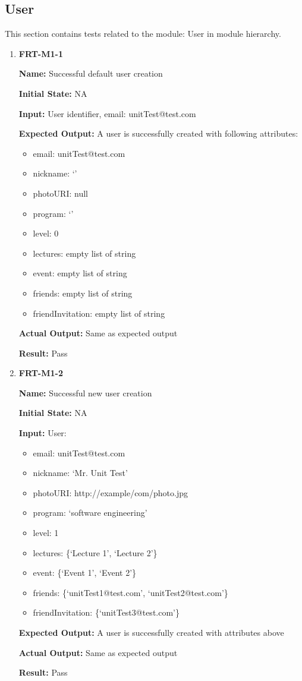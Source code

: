 \documentclass[12pt, titlepage]{article}
\begin{document}
\subsection{User}
This section contains tests related to the module: User in module hierarchy.
\begin{enumerate}
\item \textbf{FRT-M1-1}

\textbf{Name:} Successful default user creation

\textbf{Initial State:} NA

\textbf{Input:} User identifier, email: unitTest@test.com
					
\textbf{Expected Output:} A user is successfully created with following attributes:
\begin{itemize}
\item email: unitTest@test.com
\item nickname: `'
\item photoURI: null
\item program: `'
\item level: 0
\item lectures: empty list of string
\item event: empty list of string
\item friends: empty list of string
\item friendInvitation: empty list of string
\end{itemize}

\textbf{Actual Output:} Same as expected output

\textbf{Result:} Pass

\item \textbf{FRT-M1-2}

\textbf{Name:} Successful new user creation

\textbf{Initial State:} NA

\textbf{Input:} User:
\begin{itemize}
\item email: unitTest@test.com
\item nickname: `Mr. Unit Test'
\item photoURI: http://example/com/photo.jpg
\item program: `software engineering'
\item level: 1
\item lectures: \{`Lecture 1', `Lecture 2'\}
\item event: \{`Event 1', `Event 2'\}
\item friends: \{`unitTest1@test.com', `unitTest2@test.com'\}
\item friendInvitation: \{`unitTest3@test.com'\}
\end{itemize}

\textbf{Expected Output:} A user is successfully created with attributes above

\textbf{Actual Output:} Same as expected output

\textbf{Result:} Pass
\end{enumerate}
\end{document}

